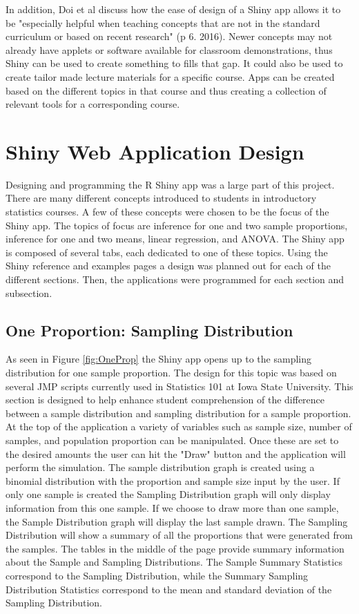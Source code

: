 \documentclass[11pt]{book}
\begin{document}
 In addition, Doi et al discuss how the ease of design of a Shiny app allows it to be "especially helpful when teaching concepts that are not in the standard curriculum or based on recent research" (p 6. 2016).  Newer concepts may not already have applets or software available for classroom demonstrations, thus Shiny can be used to create something to fills that gap.  It could also be used to create tailor made lecture materials for a specific course.  Apps can be created based on the different topics in that course and thus creating a collection of relevant tools for a corresponding course. 
 

\section{Shiny Web Application Design}
Designing and programming the R Shiny app was a large part of this project. There are many different concepts introduced to students in introductory statistics courses.  A few of these concepts were chosen to be the focus of the Shiny app.  The topics of focus are inference for one and two sample proportions, inference for one and two means, linear regression, and ANOVA.  The Shiny app is composed of several tabs, each dedicated to one of these topics. Using the Shiny reference and examples pages a design was planned out for each of the different sections. Then, the applications were programmed for each section and subsection. 


\subsection{One Proportion: Sampling Distribution}
As seen in Figure \ref{fig:OneProp} the Shiny app opens up to the sampling distribution for one sample proportion.  The design for this topic was based on several JMP scripts currently used in Statistics 101 at Iowa State University.  This section is designed to help enhance student comprehension of the difference between a sample distribution and sampling distribution for a sample proportion. At the top of the application a variety of variables such as sample size, number of samples, and population proportion can be manipulated.  Once these are set to the desired amounts the user can hit the "Draw" button and the application will perform the simulation. 
  The sample distribution graph is created using a binomial distribution with the proportion and sample size input by the user. If only one sample is created the Sampling Distribution graph will only display information from this one sample. If we choose to draw more than one sample, the Sample Distribution graph will display the last sample drawn. The Sampling Distribution will show a summary of all the proportions that were generated from the samples.  The tables in the middle of the page provide summary information about the Sample and Sampling Distributions. The Sample Summary Statistics correspond to the Sampling Distribution, while the  Summary Sampling Distribution Statistics correspond to the mean and standard deviation of the Sampling Distribution. 
\end{document}
